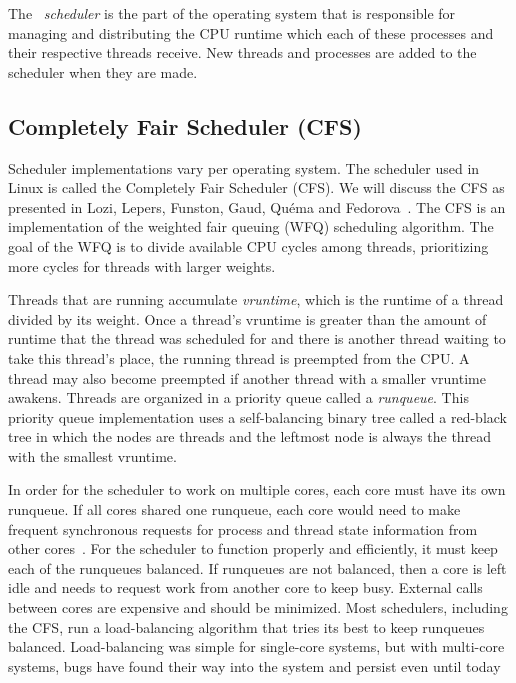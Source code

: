 \documentclass{sig-alternate}
\begin{document}
The ~\emph{scheduler} is the part of the operating system that is responsible for managing and distributing the CPU runtime which each of these processes and their respective threads receive. New threads and processes are added to the scheduler when they are made.~\cite{Lozi:2016}

\subsection{Completely Fair Scheduler (CFS)}
\label{sec:cfs}

Scheduler implementations vary per operating system. The scheduler used in Linux is called the Completely Fair Scheduler (CFS). We will discuss the CFS as presented in Lozi, Lepers, Funston, Gaud, Qu\'ema and Fedorova~\cite{Lozi:2016}. The CFS is an implementation of the weighted fair queuing (WFQ) scheduling algorithm. The goal of the WFQ is to divide available CPU cycles among threads, prioritizing more cycles for threads with larger weights.

Threads that are running accumulate \emph{vruntime}, which is the runtime of a thread divided by its weight. Once a thread's vruntime is greater than the amount of runtime that the thread was scheduled for and there is another thread waiting to take this thread's place, the running thread is preempted from the CPU. A thread may also become preempted if another thread with a smaller vruntime awakens. Threads are organized in a priority queue called a \emph{runqueue}. This priority queue implementation uses a self-balancing binary tree called a red-black tree in which the nodes are threads and the leftmost node is always the thread with the smallest vruntime.~\cite{Lozi:2016}

In order for the scheduler to work on multiple cores, each core must have its own runqueue. If all cores shared one runqueue, each core would need to make frequent synchronous requests for process and thread state information from other cores~\cite{Lozi:2016}. For the scheduler to function properly and efficiently, it must keep each of the runqueues balanced. If runqueues are not balanced, then a core is left idle and needs to request work from another core to keep busy. External calls between cores are expensive and should be minimized. Most schedulers, including the CFS, run a load-balancing algorithm that tries its best to keep runqueues balanced. Load-balancing was simple for single-core systems, but with multi-core systems, bugs have found their way into the system and persist even until today
\end{document}
